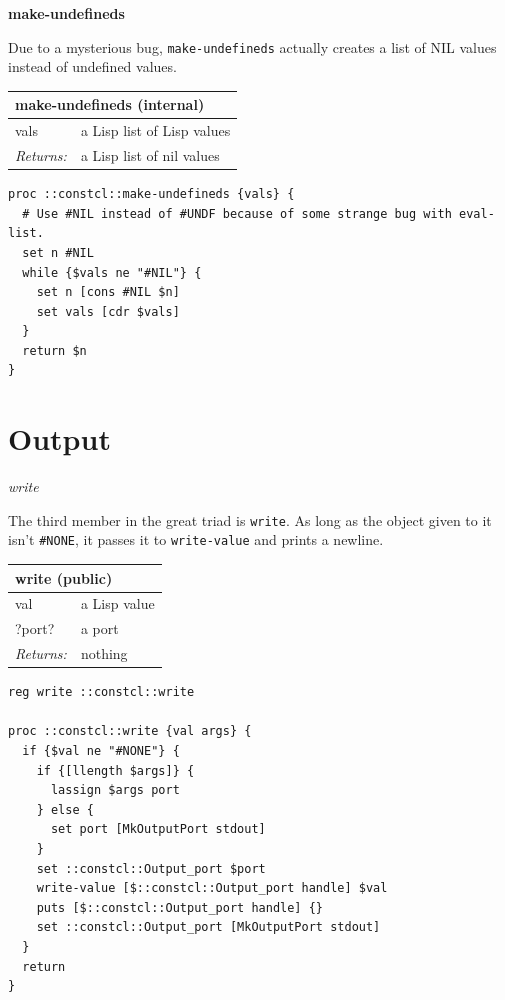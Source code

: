 \documentclass[twoside,9pt]{report}
\begin{document}
\textbf{make-undefineds}


Due to a mysterious bug, \texttt{make-undefineds} actually creates a list of NIL values instead of undefined values.

\begin{tabular}{ |l l| }
\hline
\multicolumn{2}{|l|}{make-undefineds (internal)} \\
\hline
vals & a Lisp list of Lisp values \\
\textit{Returns:} & a Lisp list of nil values \\
\hline
\end{tabular}

\noindent\makebox[\linewidth]{\rule{\linewidth}{0.4pt}}
\begin{lstlisting}
proc ::constcl::make-undefineds {vals} {
  # Use #NIL instead of #UNDF because of some strange bug with eval-list.
  set n #NIL
  while {$vals ne "#NIL"} {
    set n [cons #NIL $n]
    set vals [cdr $vals]
  }
  return $n
}
\end{lstlisting}
\noindent\makebox[\linewidth]{\rule{\linewidth}{0.4pt}}
\chapter{Output}
\label{output}

\emph{write}


The third member in the great triad is \texttt{write}. As long as the object given to it isn't \texttt{\#NONE}, it passes it to \texttt{write-value} and prints a newline.

\begin{tabular}{ |l l| }
\hline
\multicolumn{2}{|l|}{write (public)} \\
\hline
val & a Lisp value \\
?port? & a port \\
\textit{Returns:} & nothing \\
\hline
\end{tabular}

\noindent\makebox[\linewidth]{\rule{\linewidth}{0.4pt}}
\begin{lstlisting}
reg write ::constcl::write
 
proc ::constcl::write {val args} {
  if {$val ne "#NONE"} {
    if {[llength $args]} {
      lassign $args port
    } else {
      set port [MkOutputPort stdout]
    }
    set ::constcl::Output_port $port
    write-value [$::constcl::Output_port handle] $val
    puts [$::constcl::Output_port handle] {}
    set ::constcl::Output_port [MkOutputPort stdout]
  }
  return
}
\end{lstlisting}
\noindent\makebox[\linewidth]{\rule{\linewidth}{0.4pt}}
\end{document}
